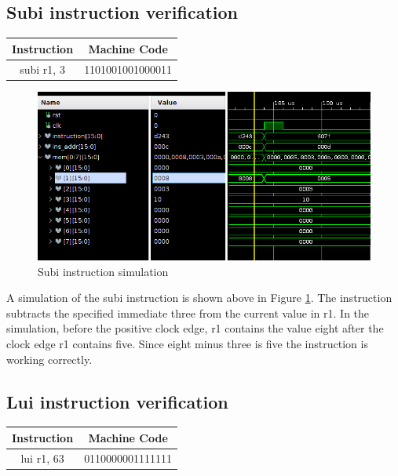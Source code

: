 \documentclass{article}
\begin{document}
	\subsection{Subi instruction verification}
		\vspace{.5cm}
		\begin{center}
			\begin{tabular}{|c|c|}
				\hline 
				\textbf{Instruction} & \textbf{Machine Code} \\ 
				\hline 
				subi r1, 3 & 1101001001000011 \\ 
				\hline 
			\end{tabular} 
		\end{center}
		
		\begin{figure}[H]
			\centering
			\includegraphics[width=5in]{img/subiinstest.png}
			\caption{Subi instruction simulation}
			\label{fig:subiinstest}
		\end{figure}
		
		\begin{par}
			A simulation of the subi instruction is shown above in Figure \ref{fig:subiinstest}. The instruction subtracts the specified immediate three from the current value in r1. In the simulation, before the positive clock edge, r1 contains the value eight after the clock edge r1 contains five. Since eight minus three is five the instruction is working correctly. 
		\end{par}
		\newpage
		
	\subsection{Lui instruction verification}
		\vspace{.5cm}
		\begin{center}
			\begin{tabular}{|c|c|}
				\hline 
				\textbf{Instruction} & \textbf{Machine Code} \\ 
				\hline 
				lui r1, 63 & 0110000001111111 \\ 
				\hline 
			\end{tabular} 
		\end{center}
		
\end{document}
